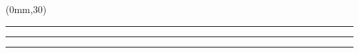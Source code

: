 \begingroup

\textblockorigin{0mm}{0mm}
\setlength{\parindent}{0mm}
\setlength{\banderougewidth}{2\TPHorizModule}
\setlength{\bandeorwidth}{\TPHorizModule}
\setlength{\gapwidth}{1pt}
\addtolength{\bandeorwidth}{-\gapwidth}

\begin{frame}[plain]
  \begin{textblock*}{125mm}(0mm,30\TPVertModule)
    \textcolor{or}{\rule{\bandeorwidth}{\TPVertModule}}%
    \rule{\gapwidth}{0pt}%
    \textcolor{rouge}{\rule{\banderougewidth}{\TPVertModule}} %
  \end{textblock*}
\end{frame}
\endgroup


